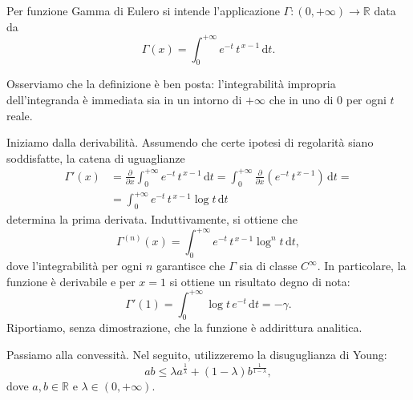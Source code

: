 
\begin{Def} 
Per funzione Gamma di Eulero si intende l'applicazione $ \Gamma:(0,+ \infty) \to \mathbb{R}$ data da
	\begin{equation*}
		\Gamma(x)= 
		\int_{0}^{+ \infty}e^{-t} \,t^{ \,x-1} \, \mathrm{d}t.
	\end{equation*}
\end{Def}
Osserviamo che la definizione è ben posta: l'integrabilità impropria dell'integranda è immediata sia in un intorno di $+ \infty$ che in uno di $0$ per ogni $t$ reale.

Iniziamo dalla derivabilità. 
Assumendo che certe ipotesi di regolarità siano soddisfatte, la catena di uguaglianze
\begin{equation*}
\begin{split}
	\Gamma'(x) 
	&= 
	\frac{ \partial}{ \partial x} \int_{0}^{+ \infty} e^{-t} \,t^{ \,x-1} \, \mathrm{d}t = 
	\int_{0}^{+ \infty} \frac{ \partial}{ \partial x} \left(e^{-t} \,t^{ \,x-1} \right) \, \mathrm{d}t = 
	\\ &= 
	\int_{0}^{+ \infty} e^{-t} \,t^{ \,x-1} \log t \, \mathrm{d}t
\end{split}
\end{equation*}
determina la prima derivata. 
Induttivamente, si ottiene che
\begin{equation*}
	\Gamma^{(n)}(x) = 
	\int_{0}^{+ \infty} e^{-t} \,t^{ \,x-1} \log^n t \, \mathrm{d}t,
\end{equation*}
dove l'integrabilità per ogni $n$ garantisce che $ \Gamma$ sia di classe $C^{ \infty}$. 
In particolare, la funzione è derivabile e per $x=1$ si ottiene un risultato degno di nota:
\begin{equation*}
	\Gamma'(1)= 
	\int_{0}^{+ \infty} \log t \, e^{-t} \, \mathrm{d}t = 
	- \gamma.
\end{equation*}
Riportiamo, senza dimostrazione, che la funzione è addirittura analitica. 


Passiamo alla convessità. 
Nel seguito, utilizzeremo la disuguglianza di Young:
\begin{equation}
	\label{young_ineq}
	ab \leq \lambda a^ \frac{1}{ \lambda} + (1- \lambda) b^ \frac{1}{1- \lambda},	
\end{equation}
dove $a,b \in \mathbb{R}$ e $ \lambda \in \left(0,+ \infty \right)$. 

